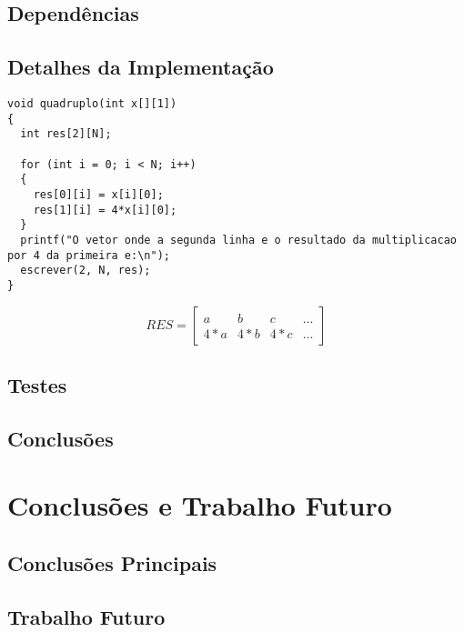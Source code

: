\documentclass[12pt,a4paper]{memoir}
\begin{document}
\section{Dependências}
\label{chap4:sec:depend}

\newpage

\section{Detalhes da Implementação}
\label{chap4:sec:det-imp}

\begin{lstlisting}[caption=\texttt{quadruplo()} e o seu funcionamento.]
void quadruplo(int x[][1])
{
  int res[2][N];

  for (int i = 0; i < N; i++)
  {
    res[0][i] = x[i][0];
    res[1][i] = 4*x[i][0]; 
  }
  printf("O vetor onde a segunda linha e o resultado da multiplicacao por 4 da primeira e:\n");
  escrever(2, N, res);
}
\end{lstlisting}

\vspace{\baselineskip} \noindent

$$ RES  = \begin{bmatrix}
a & b & c & ...\\
4*a & 4*b & 4*c & ...
\end{bmatrix}
$$


\newpage

\noindent

\section{Testes}
\label{sec:testes}

\newpage

\section{Conclusões}
\label{chap4:sec:concs}

\clearpage{\thispagestyle{empty}\cleardoublepage}



\chapter{Conclusões e Trabalho Futuro}
\label{chap:conc-trab-futuro}

\section{Conclusões Principais}
\label{sec:conc-princ}


\section{Trabalho Futuro}
\label{sec:trab-futuro}

\clearpage{\thispagestyle{empty}\cleardoublepage}

\backmatter



\nocite{LATEXDoc}
\nocite{TutorialsPoint}
\nocite{DoxygenDoc}
\end{document}
